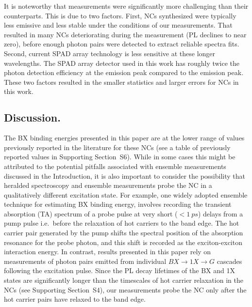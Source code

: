 \documentclass[journal=nalefd, manuscript=letter, layout=twocolumn]{achemso}
\newcommand{\supp}[1]{Supporting Section~S#1}
\begin{document}
It is noteworthy that  measurements were significantly more challenging than their  counterparts. This is due to two factors. First,  NCs synthesized were typically less emissive and less stable under the conditions of our measurements. That resulted in many NCs deteriorating during the measurement (PL declines to near zero), before enough photon pairs were detected to extract reliable spectra fits. Second, current SPAD array technology is less sensitive at these longer wavelengths\cite{Antolovic2018}. The SPAD array detector used in this work has roughly twice the photon detection efficiency at the  emission peak compared to the  emission peak. These two factors resulted in the smaller statistics and larger errors for  NCs in this work.

\subsection*{Discussion.}
The BX binding energies presented in this paper are at the lower range of values previously reported in the literature for these NCs (see a table of previously reported values in \supp{6}). While in some cases this might be attributed to the potential pitfalls associated with ensemble measurements discussed in the Introduction, it is also important to consider the possibility that heralded spectroscopy and ensemble measurements probe the NC in a qualitatively different excitation state.
For example, one widely adopted ensemble technique for estimating BX binding energy, involves recording the transient absorption (TA) spectrum of a probe pulse at very short ($<\SI{1}{ps}$) delays from a pump pulse i.e.\ before the relaxation of hot carriers to the band edge\cite{Klimov2007,Makarov2016,Aneesh2017}. The hot carrier pair generated by the pump shifts the spectral position of the absorption resonance for the probe photon, and this shift is recorded as the exciton-exciton interaction energy. In contrast, results presented in this paper rely on measurements of photon pairs emitted from individual $BX{\rightarrow}1X{\rightarrow}G$ cascades following the excitation pulse. Since the PL decay lifetimes of the BX and 1X states are significantly longer than the timescales of hot carrier relaxation in the NCs (see \supp{4}), our measurements probe the NC only after the hot carrier pairs have relaxed to the band edge.
\end{document}
